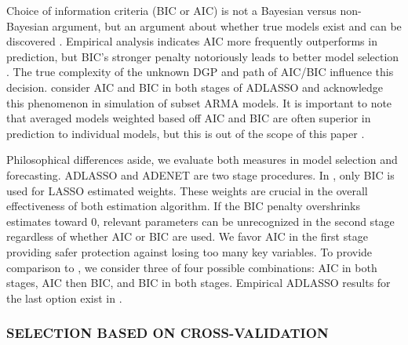 Choice of information criteria (BIC or AIC) is not a Bayesian versus non-Bayesian argument, but an argument about whether true models exist and can be discovered \citep{burnham2003}. Empirical analysis indicates AIC more frequently outperforms in prediction, but BIC's stronger penalty notoriously leads to better model selection \citep{Burnham2004}. The true complexity of the unknown DGP and path of AIC/BIC influence this decision\citep{Shao1997,burnham2003}. \cite{Chen2011} consider AIC and BIC in both stages of ADLASSO and acknowledge this phenomenon in simulation of subset ARMA models.  It is important to note that averaged models weighted based off AIC and BIC are often superior in prediction to individual models, but this is out of the scope of this paper \citep{Burnham2004}. 

Philosophical differences aside, we evaluate both measures in model selection and forecasting. ADLASSO and ADENET are two stage procedures. In \cite{Chen2011}, only BIC is used for LASSO estimated weights. These weights are crucial in the overall effectiveness of both estimation algorithm. If the BIC penalty overshrinks estimates toward $0$, relevant parameters can be unrecognized in the second stage regardless of whether AIC or BIC are used. We favor AIC in the first stage providing safer protection against losing too many key variables. To provide comparison to \cite{Chen2011}, we consider three of four possible combinations: AIC in both stages, AIC then BIC, and BIC in both stages. Empirical ADLASSO results for the last option exist in \cite{Chen2011}.

\subsubsection{SELECTION BASED ON CROSS-VALIDATION}


